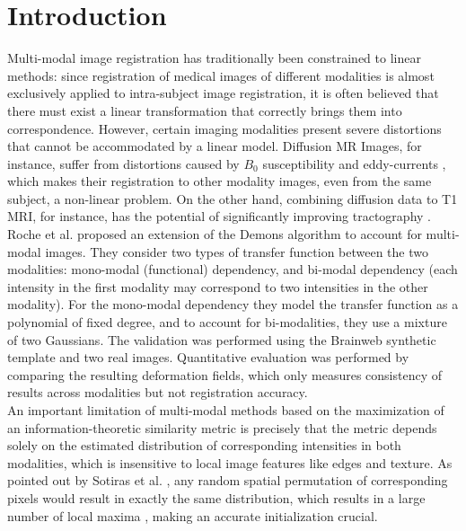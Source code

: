 \section{Introduction}

Multi-modal image registration has traditionally been constrained to linear methods: since registration of medical images of different modalities is almost exclusively
applied to intra-subject image registration, it is often believed that there must exist a linear transformation that correctly brings them into correspondence. However,
certain imaging modalities present severe distortions that cannot be accommodated by a linear model. Diffusion MR Images, for instance, suffer from distortions caused by
$B_{0}$ susceptibility and eddy-currents \cite{Tournier2011}\cite{Andersson2003}, which makes their registration to other modality images, even from the same subject,
a non-linear problem. On the other hand, combining diffusion data to T1 MRI, for instance, has the potential of significantly improving tractography \cite{Smith2012}.\\

Roche et al.\cite{Roche2004a} proposed an extension of the Demons algorithm to account for multi-modal images. They consider two types of transfer function between the two
modalities: mono-modal (functional) dependency, and bi-modal dependency (each intensity in the first modality may correspond to two intensities in the other modality).
For the mono-modal dependency they model the transfer function as a polynomial of fixed degree, and to account for bi-modalities, they use a mixture of two Gaussians.
The validation was performed using the Brainweb synthetic template \cite{Cocosco1997}\cite{Kwan1999} and two real images. Quantitative evaluation was performed by comparing
the resulting deformation fields, which only measures consistency of results across modalities but not registration accuracy.\\

An important limitation of multi-modal methods based on the maximization of an information-theoretic similarity metric is precisely that the
metric depends solely on the estimated distribution of corresponding intensities in both modalities, which is insensitive to local image
features like edges and texture. As pointed out by Sotiras et al. \cite{Sotiras2013}, any random spatial permutation of corresponding pixels would
result in exactly the same distribution, which results in a large number of local maxima \cite{Roche1998}, making an accurate initialization crucial.\\


